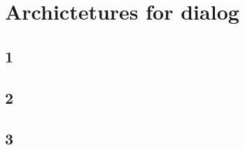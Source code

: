 \chapter{Archictetures for dialog}\label{architectures}


\section{1}

\section{2}

\section{3}





